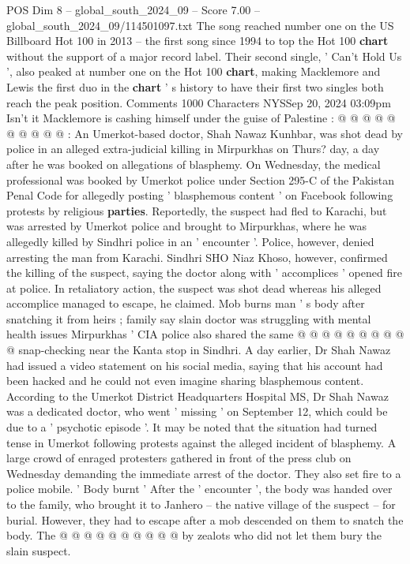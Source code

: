 \begin{textsample}{POS Dim 8 – global\_south\_2024\_09 – Score 7.00 – global\_south\_2024\_09/114501097.txt}
The song reached number one on the US Billboard Hot 100 in 2013 -- the first song since 1994 to top the Hot 100 \textbf{chart} without the support of a major record label.
Their second single, ' Can't Hold Us ', also peaked at number one on the Hot 100 \textbf{chart}, making Macklemore and Lewis the first duo in the \textbf{chart} ' s history to have their first two singles both reach the peak position.
Comments 1000 Characters NYSSep 20, 2024 03:09pm Isn't it Macklemore is cashing himself under the guise of Palestine : @ @ @ @ @ @ @ @ @ @ : An Umerkot-based doctor, Shah Nawaz Kunhbar, was shot dead by police in an alleged extra-judicial killing in Mirpurkhas on Thurs? day, a day after he was booked on allegations of blasphemy.
On Wednesday, the medical professional was booked by Umerkot police under Section 295-C of the Pakistan Penal Code for allegedly posting ' blasphemous content ' on Facebook following protests by religious \textbf{parties}.
Reportedly, the suspect had fled to Karachi, but was arrested by Umerkot police and brought to Mirpurkhas, where he was allegedly killed by Sindhri police in an ' encounter '.
Police, however, denied arresting the man from Karachi.
Sindhri SHO Niaz Khoso, however, confirmed the killing of the suspect, saying the doctor along with ' accomplices ' opened fire at police.
In retaliatory action, the suspect was shot dead whereas his alleged accomplice managed to escape, he claimed.
Mob burns man ' s body after snatching it from heirs ; family say slain doctor was struggling with mental health issues Mirpurkhas ' CIA police also shared the same @ @ @ @ @ @ @ @ @ @ snap-checking near the Kanta stop in Sindhri.
A day earlier, Dr Shah Nawaz had issued a video statement on his social media, saying that his account had been hacked and he could not even imagine sharing blasphemous content.
According to the Umerkot District Headquarters Hospital MS, Dr Shah Nawaz was a dedicated doctor, who went ' missing ' on September 12, which could be due to a ' psychotic episode '.
It may be noted that the situation had turned tense in Umerkot following protests against the alleged incident of blasphemy.
A large crowd of enraged protesters gathered in front of the press club on Wednesday demanding the immediate arrest of the doctor.
They also set fire to a police mobile. ' Body burnt ' After the ' encounter ', the body was handed over to the family, who brought it to Janhero -- the native village of the suspect -- for burial.
However, they had to escape after a mob descended on them to snatch the body.
The @ @ @ @ @ @ @ @ @ @ by zealots who did not let them bury the slain suspect.

\end{textsample}
